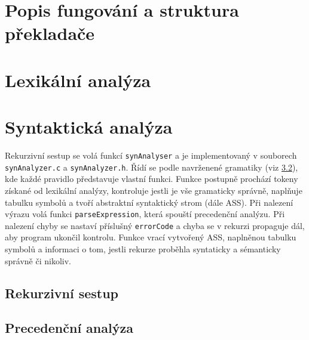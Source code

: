 \documentclass[a4paper, 12pt]{article}
\begin{document}
    \section{Popis fungování a struktura překladače}

    \section{Lexikální analýza}

    \section{Syntaktická analýza}
    Rekurzivní sestup se volá funkcí \texttt{synAnalyser} a je implementovaný v souborech \texttt{synAnalyzer.c} a \texttt{synAnalyzer.h}. Řídí se podle navrženené gramatiky (viz \ref{}), kde každé pravidlo představuje vlastní funkci. Funkce postupně prochází tokeny získané od lexikální analýzy, kontroluje jestli je vše gramaticky správně, naplňuje tabulku symbolů a tvoří abstraktní syntaktický strom (dále ASS). Při nalezení výrazu volá funkci \texttt{parseExpression}, která spouští precedenční analýzu. Při nalezení chyby se nastaví příslušný \texttt{errorCode} a chyba se v rekurzi propaguje dál, aby program ukončil kontrolu. Funkce vrací vytvořený ASS, naplněnou tabulku symbolů a informaci o tom, jestli rekurze proběhla syntaticky a sémanticky správně či nikoliv.

    \subsection{Rekurzivní sestup}

    \subsection{Precedenční analýza}
\end{document}
